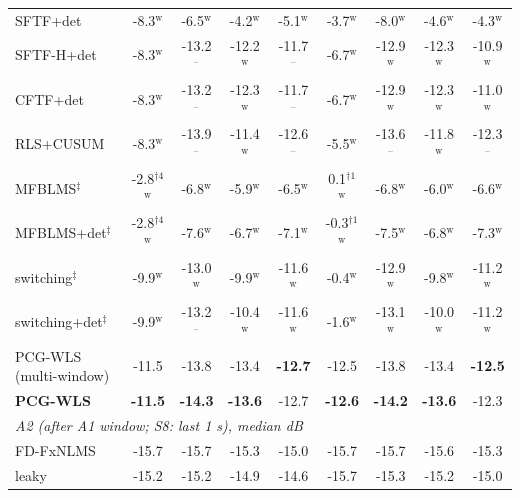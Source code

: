 \begin{table}[t]
{\begin{tabular}{lcccccccc}
SFTF+det & -8.3$^{\mathrm{w}}$ & -6.5$^{\mathrm{w}}$ & -4.2$^{\mathrm{w}}$ & -5.1$^{\mathrm{w}}$ & -3.7$^{\mathrm{w}}$ & -8.0$^{\mathrm{w}}$ & -4.6$^{\mathrm{w}}$ & -4.3$^{\mathrm{w}}$ \\
SFTF-H+det & -8.3$^{\mathrm{w}}$ & -13.2$^{\text{--}}$ & -12.2$^{\mathrm{w}}$ & -11.7$^{\text{--}}$ & -6.7$^{\mathrm{w}}$ & -12.9$^{\mathrm{w}}$ & -12.3$^{\mathrm{w}}$ & -10.9$^{\mathrm{w}}$ \\
CFTF+det & -8.3$^{\mathrm{w}}$ & -13.2$^{\text{--}}$ & -12.3$^{\mathrm{w}}$ & -11.7$^{\text{--}}$ & -6.7$^{\mathrm{w}}$ & -12.9$^{\mathrm{w}}$ & -12.3$^{\mathrm{w}}$ & -11.0$^{\mathrm{w}}$ \\
RLS+CUSUM & -8.3$^{\mathrm{w}}$ & -13.9$^{\text{--}}$ & -11.4$^{\mathrm{w}}$ & -12.6$^{\text{--}}$ & -5.5$^{\mathrm{w}}$ & -13.6$^{\text{--}}$ & -11.8$^{\mathrm{w}}$ & -12.3$^{\text{--}}$ \\
MFBLMS$^\ddagger$ & -2.8$^{\dagger4}$$^{\mathrm{w}}$ & -6.8$^{\mathrm{w}}$ & -5.9$^{\mathrm{w}}$ & -6.5$^{\mathrm{w}}$ & 0.1$^{\dagger1}$$^{\mathrm{w}}$ & -6.8$^{\mathrm{w}}$ & -6.0$^{\mathrm{w}}$ & -6.6$^{\mathrm{w}}$ \\
MFBLMS+det$^\ddagger$ & -2.8$^{\dagger4}$$^{\mathrm{w}}$ & -7.6$^{\mathrm{w}}$ & -6.7$^{\mathrm{w}}$ & -7.1$^{\mathrm{w}}$ & -0.3$^{\dagger1}$$^{\mathrm{w}}$ & -7.5$^{\mathrm{w}}$ & -6.8$^{\mathrm{w}}$ & -7.3$^{\mathrm{w}}$ \\
switching$^\ddagger$ & -9.9$^{\mathrm{w}}$ & -13.0$^{\mathrm{w}}$ & -9.9$^{\mathrm{w}}$ & -11.6$^{\mathrm{w}}$ & -0.4$^{\mathrm{w}}$ & -12.9$^{\mathrm{w}}$ & -9.8$^{\mathrm{w}}$ & -11.2$^{\mathrm{w}}$ \\
switching+det$^\ddagger$ & -9.9$^{\mathrm{w}}$ & -13.2$^{\text{--}}$ & -10.4$^{\mathrm{w}}$ & -11.6$^{\mathrm{w}}$ & -1.6$^{\mathrm{w}}$ & -13.1$^{\mathrm{w}}$ & -10.0$^{\mathrm{w}}$ & -11.2$^{\mathrm{w}}$ \\
PCG-WLS (multi-window) & -11.5 & -13.8 & -13.4 & \textbf{-12.7} & -12.5 & -13.8 & -13.4 & \textbf{-12.5} \\
\textbf{PCG-WLS} & \textbf{-11.5} & \textbf{-14.3} & \textbf{-13.6} & -12.7 & \textbf{-12.6} & \textbf{-14.2} & \textbf{-13.6} & -12.3 \\
\midrule
\multicolumn{9}{l}{\emph{A2 (after A1 window; S8: last 1 s), median dB}}\\
FD-FxNLMS & -15.7 & -15.7 & -15.3 & -15.0 & -15.7 & -15.7 & -15.6 & -15.3 \\
leaky & -15.2 & -15.2 & -14.9 & -14.6 & -15.7 & -15.3 & -15.2 & -15.0 \\

\end{tabular}}
\end{table}
